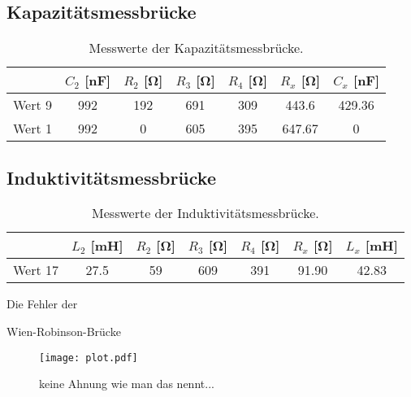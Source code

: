 \subsection{Kapazitätsmessbrücke}
\label{subsec:kap_aus}
\begin{table}[H]
  \centering
  \caption{Messwerte der Kapazitätsmessbrücke.}
  \label{tab:kap}
  \begin{tabular}{c S S S S S[table-format=3.2] S[table-format=3.2]}
   \toprule
  &{$C_2$ [\si{\nano\farad}]}&{$R_2$ [\si{\ohm}]} & {$R_3$ [\si{\ohm}]} & {$R_4$ [\si{\ohm}]}&{$R_x$ [\si{\ohm}]} & {$C_x$ [\si{\nano\farad}]}\\
  \midrule
   Wert 9 & 992 & 192 & 691 & 309 & 443.6 & 429.36\\
   Wert 1 & 992 & 0 & 605 & 395 & 647.67 & 0 \\
   \bottomrule
  \end{tabular}
\end{table}


  

\subsection{Induktivitätsmessbrücke}
\label{subsec:indu_aus}
\begin{table}[H]
  \centering
  \caption{Messwerte der Induktivitätsmessbrücke.}
  \label{tab:indu}
  \begin{tabular}{c S S S S S[table-format=3.2] S[table-format=3.2]}
  \toprule
  &{$L_2$ [\si{\milli\henry}]}&{$R_2$ [\si{\ohm}]} & {$R_3$ [\si{\ohm}]} & {$R_4$ [\si{\ohm}]}&{$R_x$ [\si{\ohm}]} & {$L_x$ [\si{\milli\henry}]}\\
  \midrule
  Wert 17& 27.5 & 59 & 609 & 391 & 91.90 & 42.83\\
  \bottomrule
  \end{tabular}
\end{table}
Die Fehler der 

Wien-Robinson-Brücke
\begin{figure}
  \centering
  \texttt{[image: plot.pdf]}
  \caption{keine Ahnung wie man das nennt...}
  \label{fig:wrb-plot}
\end{figure}



